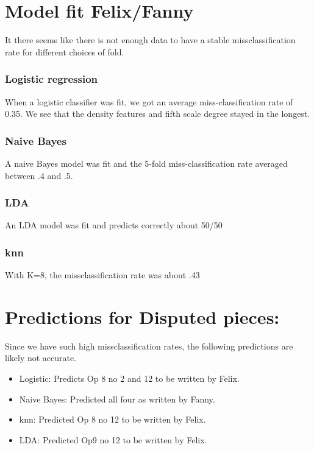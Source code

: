 \documentclass[12pt,twoside]{reedthesis}
\providecommand{\tightlist}{%
  \setlength{\itemsep}{0pt}\setlength{\parskip}{0pt}}
\theoremstyle{definition}
\theoremstyle{definition}
\theoremstyle{definition}
\theoremstyle{remark}
\begin{document}
\section{Model fit Felix/Fanny}\label{model-fit-felixfanny}

It there seems like there is not enough data to have a stable
missclassification rate for different choices of fold.

\subsubsection{Logistic regression}\label{logistic-regression-2}

When a logistic classifier was fit, we got an average
miss-classification rate of 0.35. We see that the density features and
fifth scale degree stayed in the longest.

\subsubsection{Naive Bayes}\label{naive-bayes-2}

A naive Bayes model was fit and the 5-fold miss-classification rate
averaged between .4 and .5.

\subsubsection{LDA}\label{lda-1}

An LDA model was fit and predicts correctly about 50/50

\subsubsection{knn}\label{knn-1}

With K=8, the missclassification rate was about .43

\section{Predictions for Disputed
pieces:}\label{predictions-for-disputed-pieces}

Since we have such high missclassification rates, the following
predictions are likely not accurate.
\begin{itemize}
\tightlist
\item
  Logistic: Predicts Op 8 no 2 and 12 to be written by Felix.
\item
  Naive Bayes: Predicted all four as written by Fanny.
\item
  knn: Predicted Op 8 no 12 to be written by Felix.
\item
  LDA: Predicted Op9 no 12 to be written by Felix.
\end{itemize}
\end{document}
